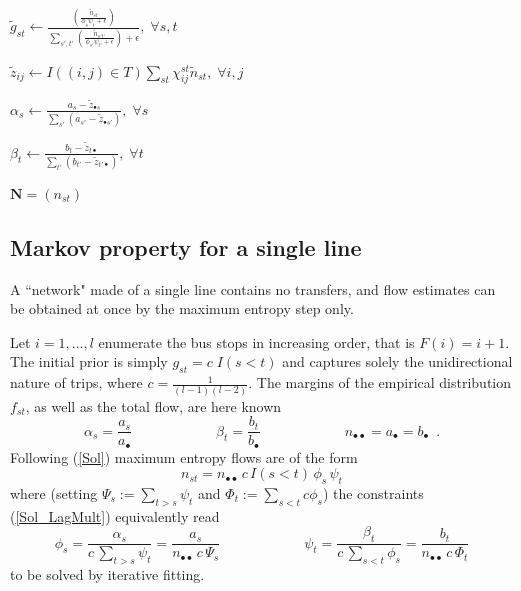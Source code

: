 \documentclass{bmcart}
\begin{document}
\begin{algorithm}[h]
\begin{algorithmic}[1]
		\State $\widetilde{g}_{st} \leftarrow \frac{\left( \frac{\widetilde{n}_{st}}{\phi_s \psi_t + \epsilon} \right)}{\sum_{s',t'} \left( \frac{\widetilde{n}_{s't'}}{\phi_{s'} \psi_{t'} + \epsilon} \right) + \epsilon}, \; \forall s,t$ 
		
		\State $\widetilde{z}_{ij} \leftarrow I((i,j) \in T)\sum_{st} \chi_{ij}^{st} \widetilde{n}_{st}, \; \forall i,j$
		
		\State $\alpha_s \leftarrow \frac{a_s - \widetilde{z}_{\bullet s}}{\sum_{s'}(a_{s'} - \widetilde{z}_{\bullet {s'}})}, \; \forall s$ 
		
		\State $\beta_t \leftarrow \frac{b_t - \widetilde{z}_{t \bullet}}{\sum_{t'} (b_{t'} - \widetilde{z}_{{t'} \bullet})}, \; \forall t$ 
		
		\EndWhile
		\State \Return $\mathbf{N} = (n_{st})$
	\end{algorithmic}
\end{algorithm}


\subsection{Markov property for a single line}
\label{Single line}
A ``network" made of a single line contains no transfers, and flow estimates can be obtained at once by the maximum entropy step only.

Let  $i=1,\ldots, l$ enumerate the bus stops in increasing order, that is $F(i)=i+1$. The initial prior is simply $g_{st}=c\; I(s<t)$ and captures solely the unidirectional nature of trips, where $c=\frac{1}{(l-1)(l-2)}$.   The margins of the empirical distribution $f_{st}$, as well as the total flow, are here known
\begin{equation}
\alpha_s=\frac{a_s}{a_\bullet}\qquad\qquad\qquad \beta_t=\frac{b_t}{b_\bullet}\qquad\qquad\qquad n_{\bullet\bullet}=a_{\bullet}=b_\bullet\enspace. 
\end{equation}
Following  (\ref{Sol}) maximum entropy flows are of the form
\begin{equation}
\label{nosignle}
n_{st}= n_{\bullet\bullet}\,  c\, I(s<t)\, \phi_s\,  \psi_t 
\end{equation}
where (setting $\Psi_s:=\sum_{t>s}\psi_t$ and $\Phi_t:=\sum_{s<t}c\phi_s$) the constraints (\ref{Sol_LagMult}) equivalently read
\begin{equation}
\label{dis embarking constraints}
\phi_s=\frac{\alpha_s}{c\, \sum_{t>s}\psi_t}=\frac{a_s}{n_{\bullet\bullet}\,  c\, \Psi_s}
\qquad\qquad\qquad
\psi_t=\frac{\beta_t}{c\, \sum_{s<t}\phi_s}=\frac{b_t}{n_{\bullet\bullet}\, c\, \Phi_t}
\end{equation}
to be solved by iterative fitting. 
\end{document}
